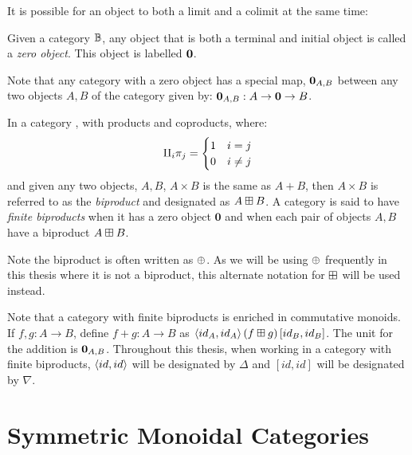 It is possible for an object to both a limit and a colimit at the same time:
\begin{definition}\label{def:categorical_zero}
  Given a category $\mathbb{B}$, any object that is both a terminal and initial object is called a
  \emph{zero object}. This object is labelled $\mathbf{0}$.
\end{definition}

Note that any category with a zero object has a special map, $\mathbf{0}_{A,B}$
between any two objects $A,B$ of the category given by: $\mathbf{0}_{A,B} : A \to \mathbf{0} \to B$.

\begin{definition}\label{def:categorical_biproduct}
  In a category \B, with products and coproducts, where:
  \[
    \amalg_{i}\pi_j = \begin{cases}
      1 & i = j\\
      0 & i \neq j
      \end{cases}
  \]
  and given any two objects, $A,B$, $A\times B$ is the same as $A+B$, then $A\times B$ is
  referred to as the \emph{biproduct} and designated as $A\boxplus B$. A category \cD{} is said to
  have \emph{finite biproducts} when it has a zero object $\mathbf{0}$ and when each pair of objects
  $A,B$ have a biproduct $A\boxplus B$.

  Note the biproduct is often written  as $\oplus$. As we will be using $\oplus$ frequently in this thesis
  where it is not a biproduct, this alternate notation for $\boxplus$ will be used instead.
\end{definition}

Note that a category with finite biproducts is enriched in commutative monoids. If $f,g:A\to
B$, define $f+g:A\to B$ as $\langle id_{A}, id_{A}\rangle\, (f\boxplus g)\, [id_{B},id_{B}]$. The unit for the
addition is $\mathbf{0}_{A,B}$. Throughout this thesis, when working in a category with finite
biproducts, $\langle id, id\rangle$ will be designated by $\Delta$ and $[id,id]$ will be designated by
$\nabla$.



\section{Symmetric Monoidal Categories} %
\label{sub:categories_with_additional_structure}

